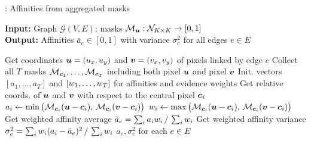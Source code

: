 
\begin{algorithm}[t]
  \begin{flushleft}
  \caption{: Affinities from aggregated \maskname masks}
   \hspace*{\algorithmicindent} \textbf{Input:} Graph $\mathcal{G}(V,E)$; \maskname masks $\mathcal{M}_{\bm{u}}: \mathcal{N}_{K\times K} \rightarrow [0,1]$  \\
  \hspace*{\algorithmicindent} \textbf{Output:} Affinities $\bar{a}_e\in[0,1]$ with variance $\sigma^2_e$ for all edges $e\in E$\\
  \hspace*{\algorithmicindent} 
  \begin{algorithmic}[1]
  \footnotesize
        \State Get coordinates $\bm{u}=(u_x,u_y)$ and $\bm{v}=(v_x,v_y)$ of pixels linked by edge $e$
        \State Collect all $T$ masks $\mathcal{M}_{\bm{c}_1},\ldots,\mathcal{M}_{\bm{c}_T}$ including both pixel $\bm{u}$ and pixel $\bm{v}$
        \State Init. vectors $[a_1,\ldots,a_T]$ and $[w_1,\ldots,w_T]$ for affinities and evidence weights
            \State Get relative coords. of $\bm{u}$ and $\bm{v}$ with respect to the central pixel $\bm{c}_i$
            \State $a_i \gets \min \big(\mathcal{M}_{\bm{c}_i}(\bm{u} - \bm{c}_i), \,\mathcal{M}_{\bm{c}_i}(\bm{v} - \bm{c}_i)\big)$ 
            \State $w_i \gets \max \big(\mathcal{M}_{\bm{c}_i}(\bm{u} - \bm{c}_i), \,\mathcal{M}_{\bm{c}_i}(\bm{v} - \bm{c}_i)\big)$ 
        \EndFor
        \State Get weighted affinity average $\bar{a}_e= \sum_{i} a_i w_i\,/\,\sum_{i}w_i$ 
        \State Get weighted affinity variance $\sigma^2_e = \sum_{i} w_i (a_i-\bar{a}_e)^2\,/\,\sum_{i}w_i$
      \EndFor
      \State
      \Return $a_e, \sigma^2_e$ for each $e\in E$
  \end{algorithmic}
    \label{alg:computing_affinities}
  \end{flushleft}

\end{algorithm}

